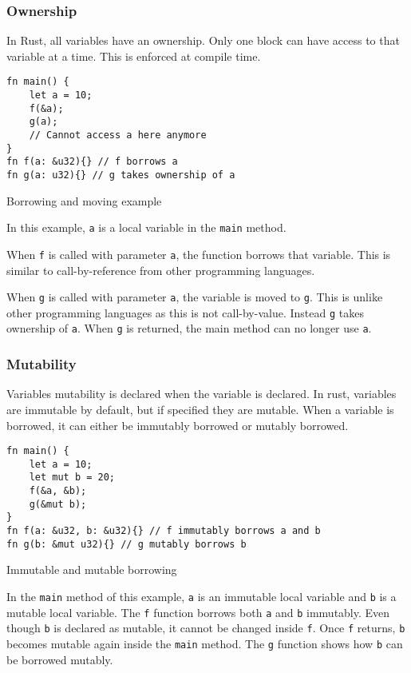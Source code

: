 \subsubsection{Ownership}
In Rust, all variables have an ownership. Only one block can have access to that variable at a time. This is enforced at compile time.

\begin{code}
\begin{verbatim}
fn main() {
    let a = 10;
    f(&a);
    g(a);
    // Cannot access a here anymore
}
fn f(a: &u32){} // f borrows a
fn g(a: u32){} // g takes ownership of a
\end{verbatim}
\caption{Borrowing and moving example}
\end{code}

In this example, \texttt{a} is a local variable in the \texttt{main} method.

When \texttt{f} is called with parameter \texttt{a}, the function borrows that variable. This is similar to call-by-reference from other programming languages.

When \texttt{g} is called with parameter \texttt{a}, the variable is moved to \texttt{g}. This is unlike other programming languages as this is not call-by-value. Instead \texttt{g} takes ownership of \texttt{a}. When \texttt{g} is returned, the main method can no longer use \texttt{a}.

\subsubsection{Mutability}
Variables mutability is declared when the variable is declared. In rust, variables are immutable by default, but if specified they are mutable. When a variable is borrowed, it can either be immutably borrowed or mutably borrowed.

\begin{code}
\begin{verbatim}
fn main() {
    let a = 10;
    let mut b = 20;
    f(&a, &b);
    g(&mut b);
}
fn f(a: &u32, b: &u32){} // f immutably borrows a and b
fn g(b: &mut u32){} // g mutably borrows b
\end{verbatim}
\caption{Immutable and mutable borrowing}
\end{code}

In the \texttt{main} method of this example, \texttt{a} is an immutable local variable and \texttt{b} is a mutable local variable. The \texttt{f} function borrows both \texttt{a} and \texttt{b} immutably. Even though \texttt{b} is declared as mutable, it cannot be changed inside \texttt{f}. Once \texttt{f} returns, \texttt{b} becomes mutable again inside the \texttt{main} method. The \texttt{g} function shows how \texttt{b} can be borrowed mutably.

